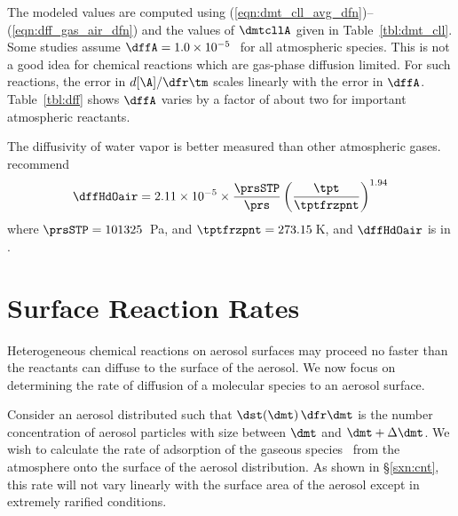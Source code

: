 \documentclass[12pt,twoside]{book}
\newcounter{reaction} %
\begin{document}
The modeled values are computed using
(\ref{eqn:dmt_cll_avg_dfn})--(\ref{eqn:dff_gas_air_dfn}) and the
values of $\dmtcllA$ given in Table~\ref{tbl:dmt_cll}.
Some studies assume $\dffA = 1.0 \times 10^{-5}$\,\mSxs\ for all
atmospheric species. 
This is not a good idea for chemical reactions which are gas-phase
diffusion limited.   
For such reactions, the error in $d[\A]/\dfr\tm$ scales linearly with the
error in $\dffA$.
Table~\ref{tbl:dff} shows $\dffA$ varies by a factor of about two for
important atmospheric reactants. 

The diffusivity of water vapor is better measured than other
atmospheric gases.
\cite{PrK78} recommend
\begin{equation}
\dffHdOair = 2.11 \times 10^{-5} \times \frac{\prsSTP}{\prs} 
\left( \frac{\tpt}{\tptfrzpnt} \right)^{1.94} 
\label{eqn:dff_H2O_air}
\end{equation}
where $\prsSTP = 101325$~Pa, and $\tptfrzpnt = 273.15$\,K, and
$\dffHdOair$ is in \mSxs.

\section[Surface Reaction Rates]{Surface Reaction Rates}
Heterogeneous chemical reactions on aerosol surfaces may proceed no
faster than the reactants can diffuse to the surface of the aerosol. 
We now focus on determining the rate of diffusion of a molecular
species to an aerosol surface.

Consider an aerosol distributed such that $\dst(\dmt) \,\dfr\dmt$ is the
number concentration of aerosol particles with size between $\dmt$ and
$\dmt + \Delta \dmt$.
We wish to calculate the rate of adsorption of the gaseous species \A\
from the atmosphere onto the surface of the aerosol distribution.
As shown in \S\ref{sxn:cnt}, this rate will not vary linearly with
the surface area of the aerosol except in extremely rarified
conditions.
\end{document}
